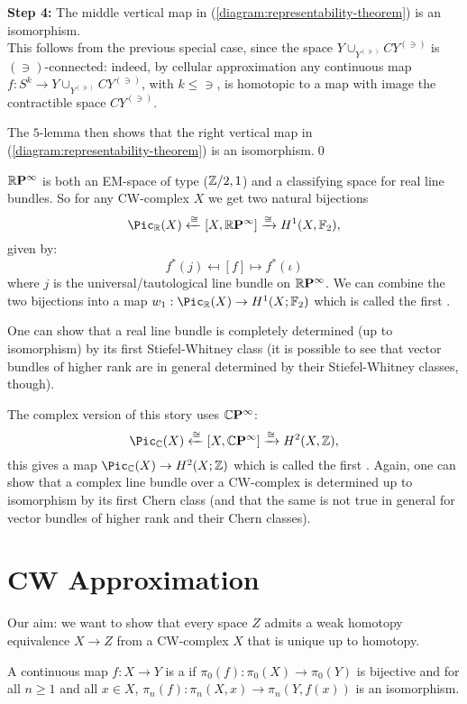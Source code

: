 \textbf{Step 4: }The middle vertical map in (\ref{diagram:representability-theorem}) is an isomorphism.\\
 This follows from the previous special case, since the space $Y\cup_{Y^{(\ni)}}CY^{(\ni)}$ is $(\ni)$-connected: indeed, by cellular approximation any continuous map $f:S^k\to Y\cup_{Y^{(\ni)}}CY^{(\ni)}$, with $k\le\ni$, is homotopic to a map with image the contractible space $CY^{(\ni)}$.

The $5$-lemma then shows that the right vertical map in (\ref{diagram:representability-theorem}) is an isomorphism.\qed

\begin{example}
${{\mathbb R}\mathbf{P}^{\infty}}$ is both an EM-space of type (${\mathbb Z}/2,1$) and a classifying space for real line bundles. So for any CW-complex $X$ we get two natural bijections
\[
    \Pic_\R(X)\xleftarrow{\cong}[X,\rp{\infty}]\xto{\cong}H^1(X,\FF_2),
\]
given by:
\[
    f^*(j)\mapsfrom [f]\mapsto f^*(\iota)
\]
where $j$ is the universal/tautological line bundle on ${{\mathbb R}\mathbf{P}^{\infty}}$. We can combine the two bijections into a map $w_1:\Pic_\R(X)\to H^1(X;\FF_2)$ which is called the first .

One can show that a real line bundle is completely determined (up to isomorphism) by its first Stiefel-Whitney class (it is possible to see that vector bundles of higher rank are in general  determined by their Stiefel-Whitney classes, though).

The complex version of this story uses ${\mathbb{C}\mathbf{P}^{\infty}}$:
\[
    \Pic_\CC(X)\xleftarrow{\cong}[X,\cp{\infty}]\xto{\cong} H^2(X,\Z),
\]
this gives a map $\Pic_\CC(X)\to H^2(X;\Z)$ which is called the first . Again, one can show that a complex line bundle over a CW-complex is determined up to isomorphism by its first Chern class (and that the same is not true in general for vector bundles of higher rank and their Chern classes).
\end{example}

\section{CW Approximation}

Our aim: we want to show that every space $Z$ admits a weak homotopy equivalence $X\to Z$ from a CW-complex $X$ that is unique up to homotopy.

A continuous map $f:X\to Y$ is a  if $\pi_0(f):\pi_0(X)\to\pi_0(Y)$ is bijective and for all $n\ge1$ and all $x\in X$, $\pi_n(f):\pi_n(X,x)\to\pi_n(Y,f(x))$ is an isomorphism.

